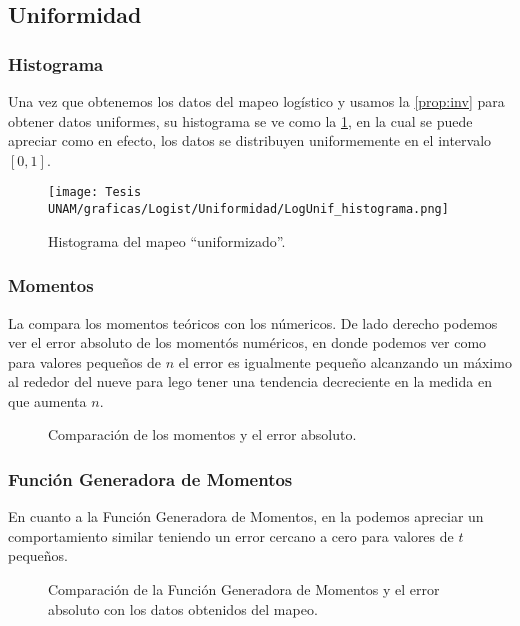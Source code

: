 \documentclass[../Main.tex]{subfiles}
\begin{document}
\subsection{Uniformidad}
\subsubsection{Histograma}
Una vez que obtenemos los datos del mapeo logístico y usamos la \cref{prop:inv} para obtener datos uniformes, su histograma se ve como la \cref{fig:hist_Log}, en la cual se puede apreciar como en efecto, los datos se distribuyen uniformemente en el intervalo $[0,1]$.
\begin{figure}[h!]
    \centering
    \texttt{[image: Tesis UNAM/graficas/Logist/Uniformidad/LogUnif\_histograma.png]}
    \caption{Histograma del mapeo ``uniformizado''.}
    \label{fig:hist_Log}
\end{figure} 

\subsubsection{Momentos}
    La  compara los momentos teóricos con los númericos. De lado derecho podemos ver el error absoluto de los momentós numéricos, en donde podemos ver como para valores pequeños de $n$ el error es igualmente pequeño alcanzando un máximo al rededor del nueve para lego tener una tendencia decreciente en la medida en que aumenta $n$.
\begin{figure}[h!]
\hfill
{}
\hfill
{}
\hfill
\caption{Comparación de los momentos y el error absoluto.}
\label{fig:Log_momentos}
\end{figure}

\subsubsection{Función Generadora de Momentos}

En cuanto a la Función Generadora de Momentos, en la  podemos apreciar un comportamiento similar teniendo un error cercano a cero para valores de $t$ pequeños.


\begin{figure}[h!]
\hfill
{}
\hfill
{}
\hfill
\caption{Comparación de la Función Generadora de Momentos y el error absoluto con los datos obtenidos del mapeo.}
\label{fig:FGM_Log}
\end{figure}
\end{document}
